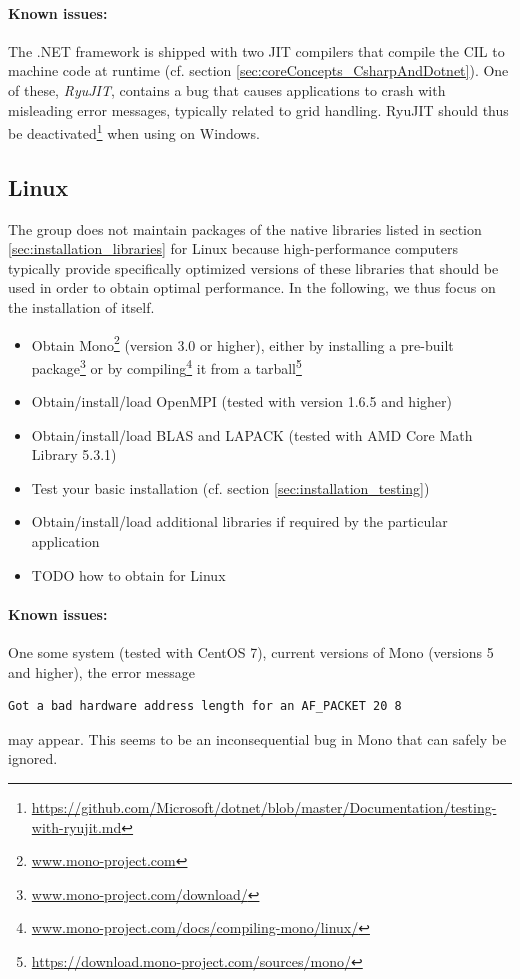 \documentclass[a4paper,10pt]{report} %
\begin{document}
\paragraph{Known issues:}
The .NET framework is shipped with two JIT compilers that compile the CIL to machine code at runtime (cf. section \ref{sec:coreConcepts_CsharpAndDotnet}). One of these, \emph{RyuJIT}, contains a bug that causes \BoSSS{} applications to crash with misleading error messages, typically related to grid handling. RyuJIT should thus be deactivated\footnote{\url{https://github.com/Microsoft/dotnet/blob/master/Documentation/testing-with-ryujit.md}} when using \BoSSS{} on Windows.


\subsection{Linux}
The \BoSSS{} group does not maintain packages of the native libraries listed in section \ref{sec:installation_libraries} for Linux because high-performance computers typically provide specifically optimized versions of these libraries that should be used in order to obtain optimal performance. In the following, we thus focus on the installation of \BoSSS{} itself. 

\begin{itemize}
	\item Obtain Mono\footnote{\url{www.mono-project.com}} (version 3.0 or higher), either by installing a pre-built package\footnote{\url{www.mono-project.com/download/}} or by compiling\footnote{\url{www.mono-project.com/docs/compiling-mono/linux/}} it from a tarball\footnote{\url{https://download.mono-project.com/sources/mono/}}
	\item Obtain/install/load OpenMPI (tested with version 1.6.5 and higher)
	\item Obtain/install/load BLAS and LAPACK (tested with AMD Core Math Library 5.3.1)
	\item Test your basic installation (cf. section \ref{sec:installation_testing})
	\item Obtain/install/load additional libraries if required by the particular \BoSSS{} application
	\item TODO how to obtain \BoSSS{} for Linux
\end{itemize}


\paragraph{Known issues:}
One some system (tested with CentOS 7), current versions of Mono (versions 5 and higher), the error message
\begin{verbatim}
Got a bad hardware address length for an AF_PACKET 20 8
\end{verbatim}
may appear. This seems to be an inconsequential bug in Mono that can safely be ignored.
\end{document}
